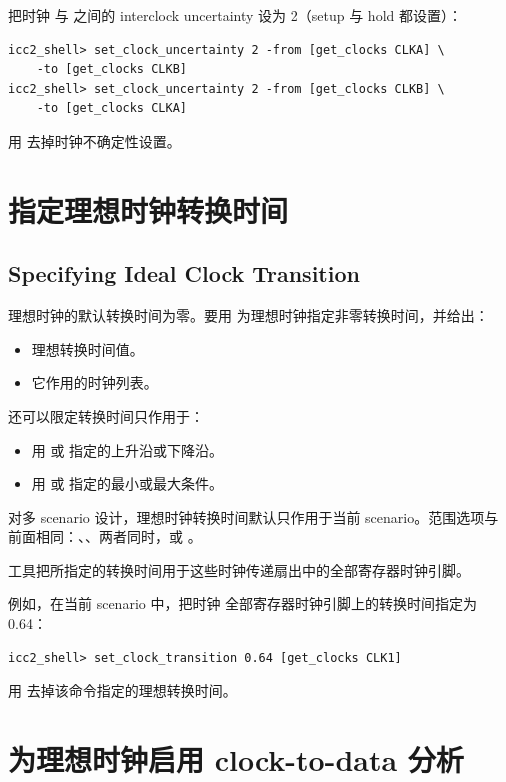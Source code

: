 把时钟  与  之间的 interclock uncertainty 设为 2（setup 与 hold 都设置）：
\begin{lstlisting}
icc2_shell> set_clock_uncertainty 2 -from [get_clocks CLKA] \
    -to [get_clocks CLKB]
icc2_shell> set_clock_uncertainty 2 -from [get_clocks CLKB] \
    -to [get_clocks CLKA]
\end{lstlisting}

用  去掉时钟不确定性设置。

\section{指定理想时钟转换时间}
\subsection*{Specifying Ideal Clock Transition}

理想时钟的默认转换时间为零。要用  为理想时钟指定非零转换时间，并给出：
\begin{itemize}
  \item 理想转换时间值。
  \item 它作用的时钟列表。
\end{itemize}

还可以限定转换时间只作用于：
\begin{itemize}
  \item 用  或  指定的上升沿或下降沿。
  \item 用  或  指定的最小或最大条件。
\end{itemize}

对多 scenario 设计，理想时钟转换时间默认只作用于当前 scenario。范围选项与前面相同：、、两者同时，或 。

工具把所指定的转换时间用于这些时钟传递扇出中的全部寄存器时钟引脚。

例如，在当前 scenario 中，把时钟  全部寄存器时钟引脚上的转换时间指定为 0.64：
\begin{lstlisting}
icc2_shell> set_clock_transition 0.64 [get_clocks CLK1]
\end{lstlisting}

用  去掉该命令指定的理想转换时间。

\section{为理想时钟启用 clock-to-data 分析}
